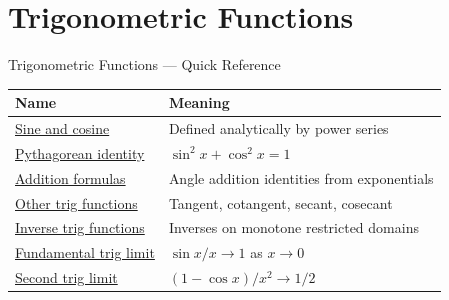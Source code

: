 \section{Trigonometric Functions}

\begin{toolkitbox}{Trigonometric Functions --- Quick Reference}
\small
\begin{tabular}{l l}
\toprule
\textbf{Name} & \textbf{Meaning} \\
\midrule
\hyperref[def:sine-cosine]{Sine and cosine} & Defined analytically by power series \\
\hyperref[prop:pythagorean-identity]{Pythagorean identity} & \(\sin^2x+\cos^2x=1\) \\
\hyperref[prop:trig-addition-formulas]{Addition formulas} & Angle addition identities from exponentials \\
\hyperref[def:other-trig]{Other trig functions} & Tangent, cotangent, secant, cosecant \\
\hyperref[def:inverse-trig]{Inverse trig functions} & Inverses on monotone restricted domains \\
\hyperref[thm:fundamental-trig-limit]{Fundamental trig limit} & \(\sin x/x\to 1\) as \(x\to 0\) \\
\hyperref[prop:limit-one-minus-cos]{Second trig limit} & \((1-\cos x)/x^2\to 1/2\) \\
\bottomrule
\end{tabular}
\end{toolkitbox}


